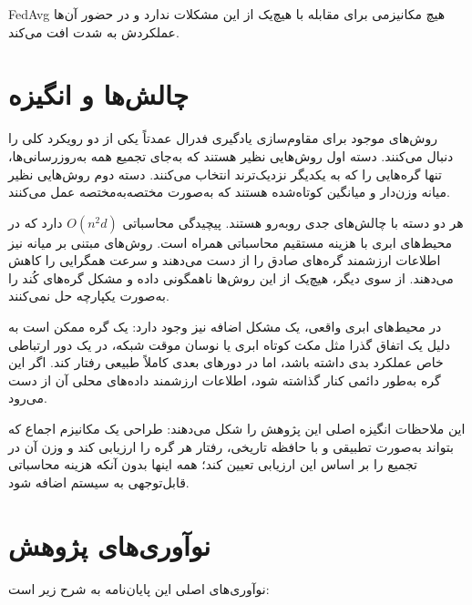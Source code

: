 \gls{FedAvg} هیچ مکانیزمی برای مقابله با هیچ‌یک از این مشکلات ندارد و در حضور آن‌ها عملکردش به شدت افت می‌کند.

\section{چالش‌ها و انگیزه}
\label{sec:motivation}

روش‌های موجود برای مقاوم‌سازی یادگیری فدرال عمدتاً یکی از دو رویکرد کلی را دنبال می‌کنند. دسته اول روش‌هایی نظیر  \cite{blanchard2017machine} هستند که به‌جای تجمیع همه به‌روزرسانی‌ها، تنها گره‌هایی را که به یکدیگر نزدیک‌ترند انتخاب می‌کنند. دسته دوم روش‌هایی نظیر میانه وزن‌دار \cite{yin2018byzantine} و میانگین کوتاه‌شده \cite{yin2018byzantine} هستند که به‌صورت مختصه‌به‌مختصه عمل می‌کنند.

هر دو دسته با چالش‌های جدی روبه‌رو هستند.  پیچیدگی محاسباتی $O(n^2 d)$ دارد که در محیط‌های ابری با هزینه مستقیم محاسباتی همراه است. روش‌های مبتنی بر میانه نیز اطلاعات ارزشمند گره‌های صادق را از دست می‌دهند و سرعت همگرایی را کاهش می‌دهند. از سوی دیگر، هیچ‌یک از این روش‌ها ناهمگونی داده و مشکل گره‌های کُند را به‌صورت یکپارچه حل نمی‌کنند.

در محیط‌های ابری واقعی، یک مشکل اضافه نیز وجود دارد: یک گره ممکن است به دلیل یک اتفاق گذرا مثل مکث کوتاه ابری یا نوسان موقت شبکه، در یک دور ارتباطی خاص عملکرد بدی داشته باشد، اما در دورهای بعدی کاملاً طبیعی رفتار کند. اگر این گره به‌طور دائمی کنار گذاشته شود، اطلاعات ارزشمند داده‌های محلی آن از دست می‌رود.

این ملاحظات انگیزه اصلی این پژوهش را شکل می‌دهند: طراحی یک مکانیزم اجماع که بتواند به‌صورت تطبیقی و با حافظه تاریخی، رفتار هر گره را ارزیابی کند و وزن آن در تجمیع را بر اساس این ارزیابی تعیین کند؛ همه اینها بدون آنکه هزینه محاسباتی قابل‌توجهی به سیستم اضافه شود.


\section{نوآوری‌های پژوهش}
\label{sec:contributions}

نوآوری‌های اصلی این پایان‌نامه به شرح زیر است:

